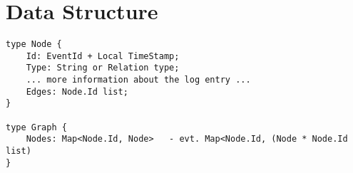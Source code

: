 \section{Data Structure}\label{sec:datastructure}
\begin{lstlisting}[breaklines=true]
type Node {
	Id: EventId + Local TimeStamp;
	Type: String or Relation type;
	... more information about the log entry ...
	Edges: Node.Id list;
}

type Graph {
	Nodes: Map<Node.Id, Node>	- evt. Map<Node.Id, (Node * Node.Id list)
}
\end{lstlisting}